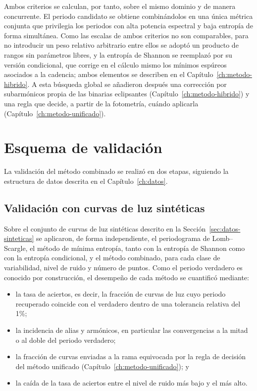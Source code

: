 \documentclass[12pt,letterpaper,oneside]{book}
\begin{document}
Ambos criterios se calculan, por tanto, sobre el mismo dominio y de manera concurrente. El periodo candidato se obtiene combin\'andolos en una \'unica m\'etrica conjunta que privilegia los periodos con alta potencia espectral y baja entrop\'ia de forma simult\'anea. Como las escalas de ambos criterios no son comparables, para no introducir un peso relativo arbitrario entre ellos se adopt\'o un producto de rangos sin par\'ametros libres, y la entrop\'ia de Shannon se reemplaz\'o por su versi\'on condicional, que corrige en el c\'alculo mismo los m\'inimos esp\'ureos asociados a la cadencia; ambos elementos se describen en el Cap\'itulo~\ref{ch:metodo-hibrido}. A esta b\'usqueda global se a\~nadieron despu\'es una correcci\'on por subarm\'onicos propia de las binarias eclipsantes (Cap\'itulo~\ref{ch:metodo-hibrido}) y una regla que decide, a partir de la fotometr\'ia, cu\'ando aplicarla (Cap\'itulo~\ref{ch:metodo-unificado}).

\section{Esquema de validaci\'on}
\label{sec:validacion}

La validaci\'on del m\'etodo combinado se realiz\'o en dos etapas, siguiendo la estructura de datos descrita en el Cap\'itulo~\ref{ch:datos}.

\subsection{Validaci\'on con curvas de luz sint\'eticas}

Sobre el conjunto de curvas de luz sint\'eticas descrito en la Secci\'on~\ref{sec:datos-sinteticas} se aplicaron, de forma independiente, el periodograma de Lomb--Scargle, el m\'etodo de m\'inima entrop\'ia, tanto con la entrop\'ia de Shannon como con la entrop\'ia condicional, y el m\'etodo combinado, para cada clase de variabilidad, nivel de ruido y n\'umero de puntos. Como el periodo verdadero es conocido por construcci\'on, el desempe\~no de cada m\'etodo se cuantific\'o mediante:

\begin{itemize}
	\item la tasa de aciertos, es decir, la fracci\'on de curvas de luz cuyo periodo recuperado coincide con el verdadero dentro de una tolerancia relativa del 1\%;
	\item la incidencia de alias y arm\'onicos, en particular las convergencias a la mitad o al doble del periodo verdadero;
	\item la fracci\'on de curvas enviadas a la rama equivocada por la regla de decisi\'on del m\'etodo unificado (Cap\'itulo~\ref{ch:metodo-unificado}); y
	\item la ca\'ida de la tasa de aciertos entre el nivel de ruido m\'as bajo y el m\'as alto.
\end{itemize}
\end{document}
